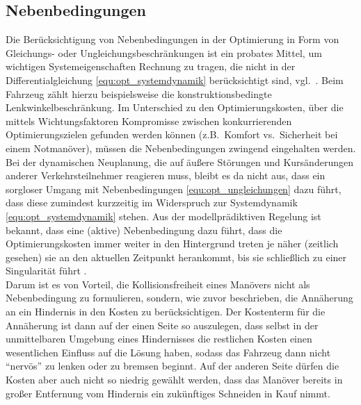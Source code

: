 \subsection{Nebenbedingungen} \label{sec:direkte_opt_nb}%
Die Berücksichtigung von Nebenbedingungen in der Optimierung in Form von Gleichungs- oder Ungleichungsbeschränkungen ist ein probates Mittel, um wichtigen Systemeigenschaften Rechnung zu tragen, die nicht in der Differentialgleichung \eqref{equ:opt_systemdynamik} berücksichtigt sind, vgl.\ \cite{habilgroell}. Beim Fahrzeug zählt hierzu beispielsweise die konstruktionsbedingte Lenkwinkelbeschränkung. Im Unterschied zu den Optimierungskosten, über die mittels Wichtungsfaktoren Kompromisse zwischen konkurrierenden Optimierungszielen gefunden werden können (z.B.\ Komfort vs.\ Sicherheit bei einem Notmanöver), müssen die Nebenbedingungen zwingend eingehalten werden. Bei der dynamischen Neuplanung, die auf äußere Störungen und Kursänderungen anderer Verkehrsteilnehmer reagieren muss, bleibt es da nicht aus, dass ein sorgloser Umgang mit Nebenbedingungen \eqref{equ:opt_ungleichungen} dazu führt, dass diese zumindest kurzzeitig im Widerspruch zur Systemdynamik \eqref{equ:opt_systemdynamik} stehen. Aus der modellprädiktiven Regelung ist bekannt, dass eine (aktive) Nebenbedingung dazu führt, dass die Optimierungskosten immer weiter in den Hintergrund treten je näher (zeitlich gesehen) sie an den aktuellen Zeitpunkt herankommt, bis sie schließlich zu einer Singularität führt \cite{foellingeroptimal}. \\
Darum ist es von Vorteil, die Kollisionsfreiheit eines Manövers nicht als Nebenbedingung zu formulieren, sondern, wie zuvor beschrieben, die Annäherung an ein Hindernis in den Kosten zu berücksichtigen. Der Kostenterm für die Annäherung ist dann auf der einen Seite so auszulegen, dass selbst in der unmittelbaren Umgebung eines Hindernisses die restlichen Kosten einen wesentlichen Einfluss auf die Lösung haben, sodass das Fahrzeug dann nicht "`nervös"' zu lenken oder zu bremsen beginnt. Auf der anderen Seite dürfen die Kosten aber auch nicht so niedrig gewählt werden, dass das Manöver bereits in großer Entfernung vom Hindernis ein zukünftiges Schneiden in Kauf nimmt. \\ 
